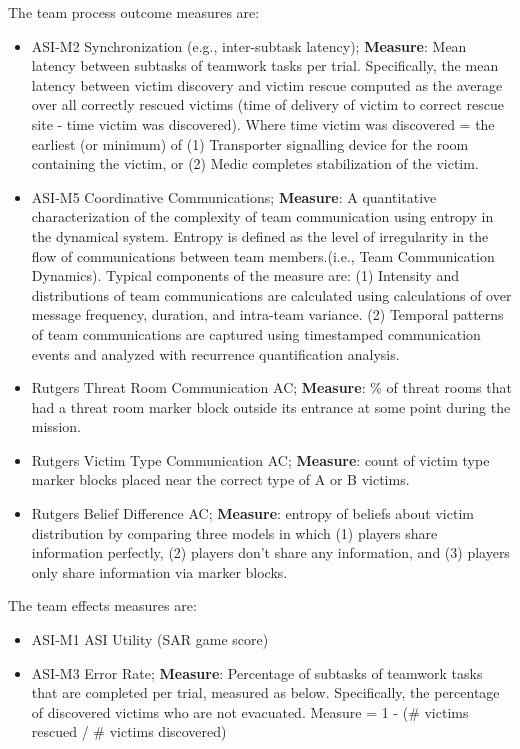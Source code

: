 The team process outcome measures are:
\begin{itemize}
    \item
    ASI-M2 Synchronization (e.g., inter-subtask latency); \textbf{Measure}: Mean latency
    between subtasks of teamwork tasks per trial. Specifically, the mean latency
    between victim discovery and victim rescue computed as the average over all
    correctly rescued victims (time of delivery of victim to correct rescue site
    - time victim was discovered). Where time victim was discovered = the
    earliest (or minimum) of (1) Transporter signalling device for the room
    containing the victim, or (2) Medic completes stabilization of the victim.
 
    \item
    ASI-M5 Coordinative Communications; \textbf{Measure}: A quantitative characterization
    of the complexity of team communication using entropy in the dynamical
    system. Entropy is defined as the level of irregularity in the flow of
    communications between team members.(i.e., Team Communication Dynamics).
    Typical components of the measure are: (1) Intensity and distributions of
    team communications are calculated using calculations of over message
    frequency, duration, and intra-team variance. (2) Temporal patterns of team
    communications are captured using timestamped communication events and
    analyzed with recurrence quantification analysis.

    \item
    Rutgers Threat Room Communication AC; \textbf{Measure}: \% of threat rooms that had a
    threat room marker block outside its entrance at some point during the
    mission.  

    \item
    Rutgers Victim Type Communication AC; \textbf{Measure}: count of victim
    type marker blocks placed near the correct type of A or B victims.
    
    \item
    Rutgers Belief Difference AC; \textbf{Measure}: entropy of beliefs about victim
    distribution by comparing three models in which (1) players share
    information perfectly, (2) players don't share any information, and (3)
    players only share information via marker blocks.  
\end{itemize}

The team effects measures are: 

\begin{itemize}
    \item
    ASI-M1 ASI Utility (SAR game score) 
    \item

    ASI-M3 Error Rate; \textbf{Measure}: Percentage of
    subtasks of teamwork tasks that are completed per trial, measured as below.
    Specifically, the percentage of discovered victims who are not evacuated.
    Measure = 1 - (\# victims rescued / \# victims discovered)
\end{itemize}

